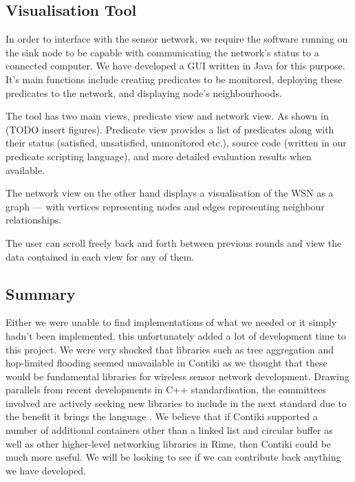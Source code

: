 \subsection{Visualisation Tool}

In order to interface with the sensor network, we require the software running on the sink node to be capable with communicating the network's status to a connected computer. We have developed a GUI written in Java for this purpose. It's main functions include creating predicates to be monitored, deploying these predicates to the network, and displaying node's neighbourhoods.

The tool has two main views, predicate view and network view. As shown in (TODO insert figures). Predicate view provides a list of predicates along with their status (satisfied, unsatisfied, unmonitored etc.), source code (written in our predicate scripting language), and more detailed evaluation results when available.

The network view on the other hand displays a visualisation of the WSN as a graph --- with vertices representing nodes and edges representing neighbour relationships.

The user can scroll freely back and forth between previous rounds and view the data contained in each view for any of them.

\subsection{Summary}

Either we were unable to find implementations of what we needed or it simply hadn't been implemented, this unfortunately added a lot of development time to this project. We were very shocked that libraries such as tree aggregation and hop-limited flooding seemed unavailable in Contiki as we thought that these would be fundamental libraries for wireless sensor network development. Drawing parallels from recent developments in C++ standardisation, the committees involved are actively seeking new libraries to include in the next standard due to the benefit it brings the language \cite{c++call-for-proposals}. We believe that if Contiki supported a number of additional containers other than a linked list and circular buffer as well as other higher-level networking libraries in Rime, then Contiki could be much more useful. We will be looking to see if we can contribute back anything we have developed.

